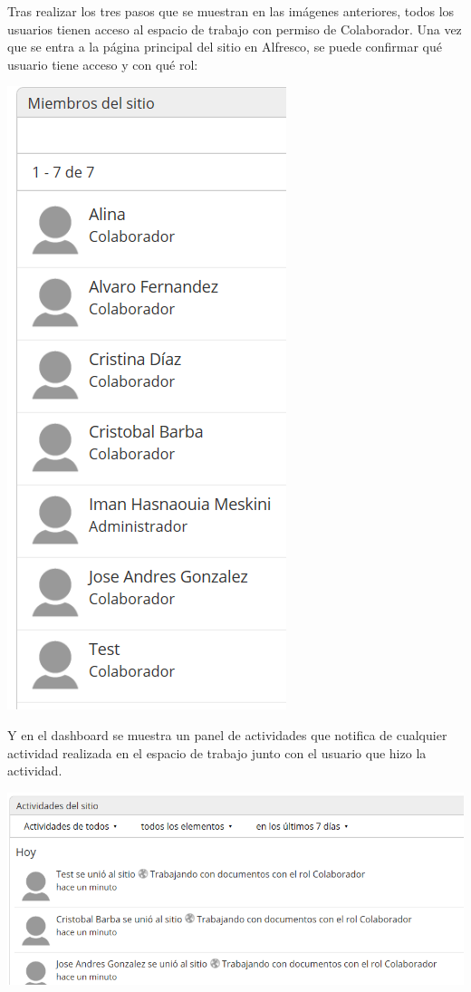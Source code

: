 \documentclass{article}
\begin{document}
Tras realizar los tres pasos que se muestran en las imágenes anteriores, todos los usuarios tienen acceso al espacio de trabajo con permiso de Colaborador. Una vez que se entra a la página principal del sitio en Alfresco, se puede confirmar qué usuario tiene acceso y con qué rol:

\begin{center}
\includegraphics[scale=0.3]{images/roles.png}
\end{center} 

Y en el dashboard se muestra un panel de actividades que notifica de cualquier actividad realizada en el espacio de trabajo junto con el usuario que hizo la actividad.

\begin{center}
\includegraphics[scale=0.5]{images/activity.png}
\end{center}
\end{document}
